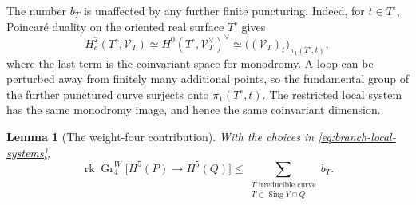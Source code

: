 \documentclass[11pt]{amsart}
\newtheorem{lemma}[theorem]{Lemma}
\theoremstyle{definition}
\theoremstyle{remark}
\numberwithin{equation}{section}
\DeclareMathOperator{\Sing}{Sing}
\DeclareMathOperator{\rk}{rk}
\DeclareMathOperator{\Gr}{Gr}
\begin{document}
The number $b_T$ is unaffected by any further finite puncturing.
Indeed, for $t\in T^\circ$, Poincar\'e duality on the oriented real
surface $T^\circ$ gives
\[
 H_c^2(T^\circ,\mathcal V_T)
 \simeq H^0(T^\circ,\mathcal V_T^\vee)^\vee
 \simeq \bigl((\mathcal V_T)_t\bigr)_{\pi_1(T^\circ,t)},
\]
where the last term is the coinvariant space for monodromy.  A loop
can be perturbed away from finitely many additional points, so the
fundamental group of the further punctured curve surjects onto
$\pi_1(T^\circ,t)$.  The restricted local system has the same
monodromy image, and hence the same coinvariant dimension.

\begin{lemma}[The weight-four contribution]\label{lem:branch-cone}
With the choices in \eqref{eq:branch-local-systems},
\begin{equation}\label{eq:branch-cone-bound}
 \rk\Gr^W_4\bigl[H^5(P)\longrightarrow H^5(Q)\bigr]
 \leq
 \sum_{\substack{T\text{ irreducible curve}\\T\subset\Sing Y\cap Q}} b_T.
\end{equation}
\end{lemma}
\end{document}
